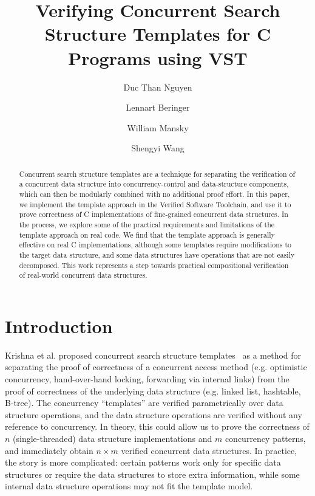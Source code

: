 \documentclass[a4paper,UKenglish,cleveref, autoref, thm-restate]{lipics-v2021}
\title{Verifying Concurrent Search Structure Templates for C Programs using VST} %
\author{Duc Than Nguyen}{University of Illinois at Chicago, USA \and \url{http://dnguye96.people.uic.edu} }{dnguye96@uic.edu}{https://orcid.org/0000-0002-1825-0097}{(Optional) author-specific funding acknowledgements}%
\author{Lennart Beringer}{Princeton University, USA \and \url{https://www.cs.princeton.edu/~eberinge} }{eberinge@cs.princeton.edu}{https://orcid.org/0000-0002-1570-3492}{(Optional) author-specific funding acknowledgements}
\author{William Mansky}{University of Illinois at Chicago, USA\and \url{https://mansky.lab.uic.edu/} }{mansky1@uic.edu}{https://orcid.org/0000-0002-5351-895X}{(Optional) author-specific funding acknowledgements}
\author{Shengyi Wang}{Princeton University, USA \and \url{https://www.cs.princeton.edu/~shengyiw} }{shengyiw@cs.princeton.edu}{https://orcid.org/[0000-0002-2286-8703}{(Optional) author-specific funding acknowledgements}
\begin{document}
\maketitle

\begin{abstract}
Concurrent search structure templates are a technique for separating the verification of a concurrent data structure into concurrency-control and data-structure components, which can then be modularly combined with no additional proof effort. In this paper, we implement the template approach in the Verified Software Toolchain, and use it to prove correctness of C implementations of fine-grained concurrent data structures. In the process, we explore some of the practical requirements and limitations of the template approach on real code. %
We find that the template approach is generally effective on real C implementations, although some templates require modifications to the target data structure, and some data structures have operations that are not easily decomposed. This work represents a step towards practical compositional verification of real-world concurrent data structures.
\end{abstract}

\section{Introduction}
\label{sec:introduction}
Krishna et al. proposed concurrent search structure templates~\cite{templates} as a method for separating the proof of correctness of a concurrent access method (e.g. optimistic concurrency, hand-over-hand locking, forwarding via internal links) from the proof of correctness of the underlying data structure (e.g. linked list, hashtable, B-tree). The concurrency ``templates'' are verified parametrically over data structure operations, and the data structure operations are verified without any reference to concurrency. In theory, this could allow us to prove the correctness of $n$ (single-threaded) data structure implementations and $m$ concurrency patterns, and immediately obtain $n \times m$ verified concurrent data structures. In practice, the story is more complicated: certain patterns work only for specific data structures or require the data structures to store extra information, while some internal data structure operations may not fit the template model. 
\end{document}
